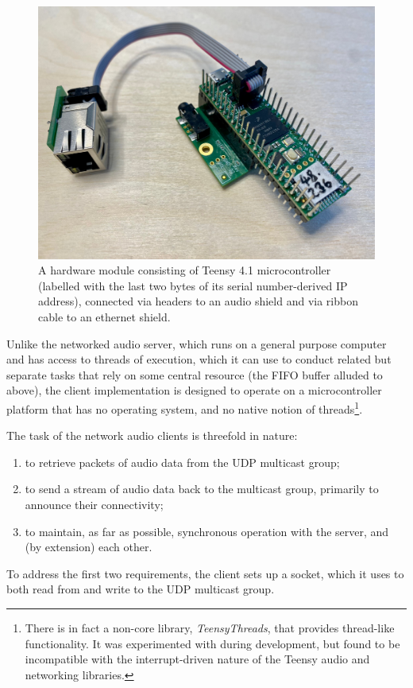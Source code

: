 \begin{figure}[ht]
    \centering
    \includegraphics[width=.75\textwidth]{figures/module}
    \caption{A hardware module consisting of Teensy 4.1 microcontroller
        (labelled with the last two bytes of its serial number-derived IP address),
        connected via headers to an audio shield and via ribbon cable to an
        ethernet shield.}
    \label{fig:teensy}
\end{figure}
\noindent
Unlike the networked audio server, which runs on a general purpose computer and
has access to threads of execution, which it can use to conduct related but
separate tasks that rely on some central resource (the FIFO buffer alluded to
above), the client implementation is designed to operate on a microcontroller
platform that has no operating system, and no native notion of threads\footnote{
    There is in fact a non-core library, \textit{TeensyThreads}, that provides
    thread-like functionality. It was experimented with during development,
    but found to be incompatible with the interrupt-driven nature of the
    Teensy audio and networking libraries.
}.

The task of the network audio clients is threefold in nature:
\begin{enumerate}
    \item to retrieve packets of audio data from the UDP multicast group;
    \item to send a stream of audio data back to the multicast group, primarily
    to announce their connectivity;
    \item to maintain, as far as possible, synchronous operation with the
    server, and (by extension) each other.
\end{enumerate}

To address the first two requirements, the client sets up a socket, which it
uses to both read from and write to the UDP multicast group.

